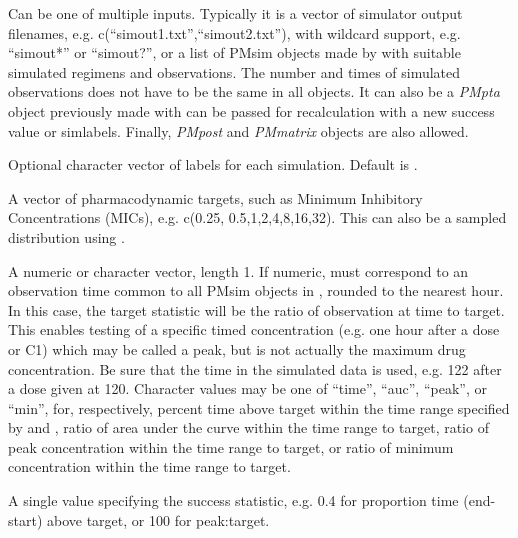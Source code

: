 \documentclass[a4paper]{book}
\begin{document}
\begin{Arguments}
\begin{ldescription}
\item[\code{simdata}] Can be one of multiple inputs.  Typically it is a vector of simulator output filenames, e.g. c(``simout1.txt'',``simout2.txt''),
with wildcard support, e.g. ``simout*'' or ``simout?'', or
a list of PMsim objects made by  with suitable simulated regimens and observations.  The number and times of simulated
observations does not have to be the same in all objects.  It can also be a \emph{PMpta} object previously made with
 can be passed for recalculation with a new success value or simlabels.  Finally, \emph{PMpost} and \emph{PMmatrix} objects are 
also allowed.

\item[\code{simlabels}] Optional character vector of labels for each simulation.  Default is .

\item[\code{targets}] A vector of pharmacodynamic targets, such as Minimum Inhibitory Concentrations (MICs), e.g. c(0.25, 0.5,1,2,4,8,16,32).
This can also be a sampled distribution using  .

\item[\code{target.type}] A numeric or character vector, length 1.  If numeric, must correspond to an observation time common to all PMsim objects in
, rounded to the nearest hour.  In this case, the target statistic will be the ratio of observation at time  to target.  This enables 
testing of a specific timed concentration (e.g. one hour after a dose or C1) which may be called a peak, but is not actually the maximum drug
concentration.  Be sure that the time in the simulated data is used, e.g. 122 after a dose given at 120.  Character values may be one of 
``time'', ``auc'', ``peak'', or ``min'', for, respectively, percent time above target within the time range
specified by  and , ratio of area under the curve within the time range to target, ratio of peak concentration within the time range 
to target, or ratio of minimum concentration within the time range to target.

\item[\code{success}] A single value specifying the success statistic, e.g. 0.4 for proportion time (end-start) above target, or 100 for peak:target.


\end{ldescription}
\end{Arguments}
\end{document}
